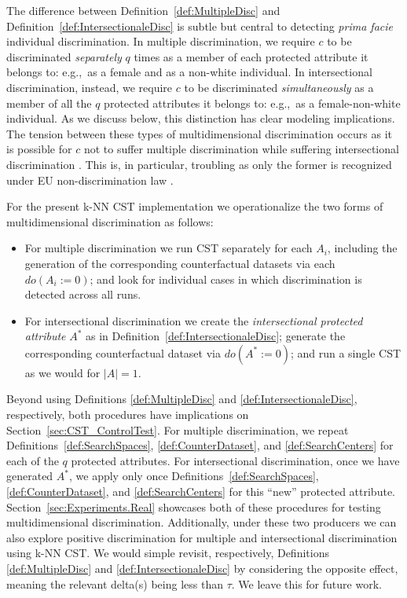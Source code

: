The difference between Definition~\ref{def:MultipleDisc} and Definition~\ref{def:IntersectionaleDisc} is subtle but central to detecting \textit{prima facie} individual discrimination.
In multiple discrimination, we require $c$ to be discriminated \textit{separately} $q$ times as a member of each protected attribute it belongs to: e.g.,~as a female and as a non-white individual.
In intersectional discrimination, instead, we require $c$ to be discriminated \textit{simultaneously} as a member of all the $q$ protected attributes it belongs to: e.g.,~as a female-non-white individual.
As we discuss below, this distinction has clear modeling implications.
%
The tension between these types of multidimensional discrimination occurs as it is possible for $c$ not to suffer multiple discrimination while suffering intersectional discrimination \parencite{Crenshaw1989_DemarginalizingTheIntersection}. 
This is, in particular, troubling as only the former is recognized under EU non-discrimination law \parencite{Xenidis2020_TunningEULaw}. 

For the present k-NN CST implementation we operationalize the two forms of multidimensional discrimination as follows:
%
\begin{itemize}
    \item For multiple discrimination we run CST separately for each $A_i$, including the generation of the corresponding counterfactual datasets via each $do(A_i := 0)$; and look for individual cases in which discrimination is detected across all runs.
    \item For intersectional discrimination we create the \textit{intersectional protected attribute} $A^*$ as in Definition~\ref{def:IntersectionaleDisc}; generate the corresponding counterfactual dataset via $do(A^* := 0)$; and run a single CST as we would for $|A|=1$.
\end{itemize}
%
Beyond using Definitions \ref{def:MultipleDisc} and \ref{def:IntersectionaleDisc}, respectively, both procedures have implications on Section~\ref{sec:CST_ControlTest}.
For multiple discrimination, we repeat Definitions~\ref{def:SearchSpaces}, \ref{def:CounterDataset}, and \ref{def:SearchCenters} for each of the $q$ protected attributes.
For intersectional discrimination, once we have generated $A^{*}$, we apply only once Definitions~\ref{def:SearchSpaces}, \ref{def:CounterDataset}, and \ref{def:SearchCenters} for this ``new'' protected attribute.
Section~\ref{sec:Experiments.Real} showcases both of these procedures for testing multidimensional discrimination.
%
Additionally, under these two producers we can also explore positive discrimination for multiple and intersectional discrimination using k-NN CST. We would simple revisit, respectively, Definitions \ref{def:MultipleDisc} and \ref{def:IntersectionaleDisc} by considering the opposite effect, meaning the relevant delta(s) being less than $\tau$.
We leave this for future work.

%
%
